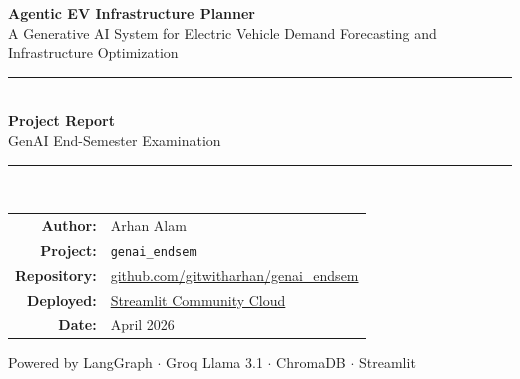 \documentclass[12pt,a4paper]{article}
\newcommand{\code}[1]{\texttt{\small\color{blue!70!black}#1}}
\begin{document}
\begin{titlepage}
    \centering
    \vspace*{2cm}
    
    {\Huge\bfseries\color{blue!70!black} Agentic EV Infrastructure Planner}\\[0.5cm]
    {\large\color{gray} A Generative AI System for Electric Vehicle Demand Forecasting and \\Infrastructure Optimization}\\[2cm]
    
    \rule{\textwidth}{0.4pt}\\[0.5cm]
    
    {\Large\bfseries Project Report}\\[0.3cm]
    {\normalsize GenAI End-Semester Examination}\\[1cm]
    
    \rule{\textwidth}{0.4pt}\\[2cm]
    
    \begin{tabular}{rl}
        \textbf{Author:}     & Arhan Alam \\[0.3cm]
        \textbf{Project:}    & \code{genai\_endsem} \\[0.3cm]
        \textbf{Repository:} & \href{https://github.com/gitwitharhan/genai_endsem}{github.com/gitwitharhan/genai\_endsem} \\[0.3cm]
        \textbf{Deployed:}   & \href{https://share.streamlit.io}{Streamlit Community Cloud} \\[0.3cm]
        \textbf{Date:}       & April 2026 \\
    \end{tabular}
    
    \vfill
    
    {\small\color{gray} Powered by LangGraph $\cdot$ Groq Llama 3.1 $\cdot$ ChromaDB $\cdot$ Streamlit}
\end{titlepage}

\tableofcontents
\vspace{1cm}
\newpage
\end{document}
